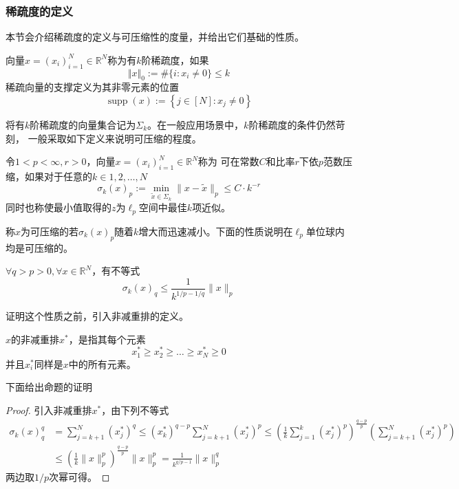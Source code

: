 \subsubsection{稀疏度的定义}
本节会介绍稀疏度的定义与可压缩性的度量，并给出它们基础的性质。
\begin{definition}
    向量$x=\left(x_i\right)^N_{i=1}\in \mathbb{R}^N$称为有$k$阶稀疏度，如果
    \begin{equation}
        \Vert x\Vert_0:=\# \{i:x_i \neq 0\} \le k
    \end{equation}
    稀疏向量的支撑定义为其非零元素的位置
\begin{equation}
    \operatorname{supp}(x):=\left\{j \in[N]: x_j \neq 0\right\}
\end{equation}
\end{definition}
将有$k$阶稀疏度的向量集合记为$\Sigma _k$。在一般应用场景中，$k$阶稀疏度的条件仍然苛刻，
一般采取如下定义来说明可压缩的程度。
\begin{definition}
    令$1<p<\infty,r>0$，向量$x=\left(x_i\right)^N_{i=1}\in \mathbb{R}^N$称为
    可在常数$C$和比率$r$下依$p$范数压缩，如果对于任意的$k \in {1,2,\ldots,N}$
   \begin{equation}
        \sigma_k(x)_p:=\min _{\tilde{x} \in \Sigma_k}\|x-\tilde{x}\|_p \leq C \cdot k^{-r}
    \end{equation}
    同时也称使最小值取得的$z$为$\ell_p$空间中最佳$k$项近似。
\end{definition}
称$x$为可压缩的若$\sigma_k(x)_p$随着$k$增大而迅速减小。下面的性质说明在$\ell_p$单位球内均是可压缩的。
\begin{proposition}
    $\forall q>p>0,\forall x\in \mathbb{R}^N$，有不等式
    \begin{equation}
        \sigma_k(x)_q \leq \frac{1}{k^{1 / p-1 / q}}\|x\|_p
    \end{equation}
\end{proposition}
证明这个性质之前，引入非减重排的定义。
\begin{definition}
    $x$的非减重排$x^*$，是指其每个元素
    \begin{equation}
        x_1^* \geq x_2^* \geq \ldots \geq x_N^* \geq 0
    \end{equation}
    并且$ x_i^*$同样是$x$中的所有元素。
\end{definition}
下面给出命题的证明
\begin{proof}
    引入非减重排$x^*$，由下列不等式
    \begin{equation}
        \begin{aligned}
        \sigma_k(x)_q^q & =\sum_{j=k+1}^N\left(x_j^*\right)^q \leq\left(x_k^*\right)^{q-p} \sum_{j=k+1}^N\left(x_j^*\right)^p \leq\left(\frac{1}{k} \sum_{j=1}^k\left(x_j^*\right)^p\right)^{\frac{q-p}{p}}\left(\sum_{j=k+1}^N\left(x_j^*\right)^p\right) \\
        & \leq\left(\frac{1}{k}\|x\|_p^p\right)^{\frac{q-p}{p}}\|x\|_p^p=\frac{1}{k^{q / p-1}}\|x\|_p^q 
        \end{aligned}
        \end{equation}
        两边取$1/p$次幂可得。
\end{proof}
